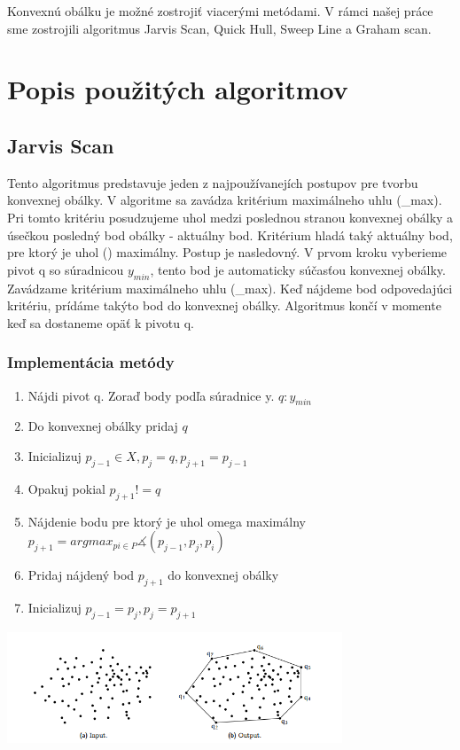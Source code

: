 \documentclass[12pt]{article}
\begin{document}
Konvexnú obálku je možné zostrojiť viacerými metódami. V rámci našej práce sme zostrojili algoritmus Jarvis Scan, Quick Hull, Sweep Line a Graham scan.


\section {Popis použitých algoritmov}
\subsection {Jarvis Scan}
Tento algoritmus predstavuje jeden z najpoužívanejích postupov pre tvorbu konvexnej obálky. V algoritme sa zavádza kritérium maximálneho uhlu (\omega_max). Pri tomto kritériu posudzujeme uhol medzi poslednou stranou konvexnej obálky a úsečkou posledný bod obálky - aktuálny bod. Kritérium hladá taký aktuálny bod, pre ktorý je uhol (\omega) maximálny. 
Postup je nasledovný. V prvom kroku vyberieme pivot q so súradnicou $y_{min}$, tento bod je automaticky súčasťou konvexnej obálky. Zavádzame kritérium maximálneho uhlu (\omega_max). Keď nájdeme bod odpovedajúci kritériu, prídáme takýto bod do konvexnej obálky. Algoritmus končí v momente keď sa dostaneme opäť k pivotu q. 

\subsubsection {Implementácia metódy}
\begin{enumerate}
\item Nájdi pivot q. Zoraď body podľa súradnice y. $ q : y_{min}$
\item Do konvexnej obálky pridaj $q$
\item Inicializuj  $p_{j-1} \in X, p_j = q, p_{j+1} = p_{j-1}$
\item Opakuj pokial $p_{j+1} != q$
\item \hspace {1.5cm} Nájdenie bodu pre ktorý je uhol omega maximálny $p_{j+1} = argmax_{pi \in P} \measuredangle(p_{j-1}, p_j, p_i)$
\item \hspace {1.5cm} Pridaj nájdený bod  $p_{j+1}$ do konvexnej obálky
\item \hspace {1.5cm} Inicializuj $p_{j-1} = p_j , p_j = p_{j+1}$ 
\end{enumerate}

\begin{center}
   \includegraphics[width=10cm]{./img/ch_obrazok1.png}
\end{center}
\end{document}

